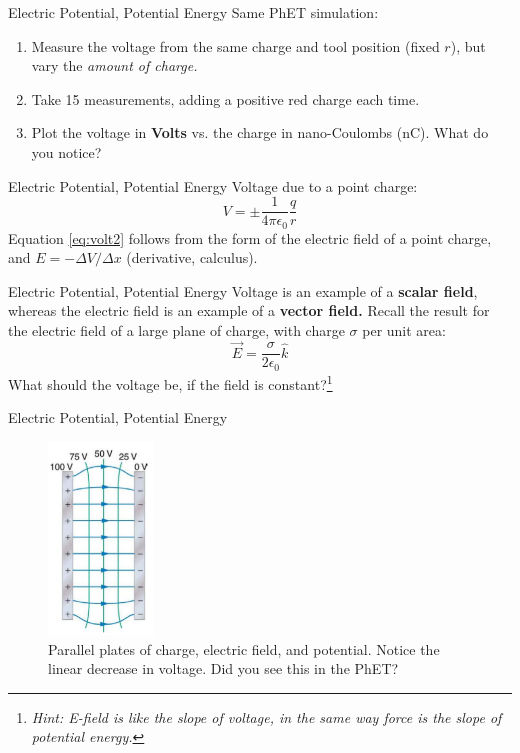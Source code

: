 \documentclass{beamer}
\begin{document}
\begin{frame}{Electric Potential, Potential Energy}
Same PhET simulation:
\begin{enumerate}
\item Measure the voltage from the same charge and tool position (fixed $r$), but vary the \textit{amount of charge.}
\item Take 15 measurements, adding a positive red charge each time.
\item Plot the voltage in \textbf{Volts} vs. the charge in nano-Coulombs (nC).  What do you notice?
\end{enumerate}
\end{frame}

\begin{frame}{Electric Potential, Potential Energy}
Voltage due to a point charge:
\begin{equation}
\boxed{
V = \pm \frac{1}{4\pi \epsilon_0} \frac{q}{r}} \label{eq:volt2}
\end{equation}
Equation \ref{eq:volt2} follows from the form of the electric field of a point charge, and $E = -\Delta V/\Delta x$ (derivative, calculus).
\end{frame}

\begin{frame}{Electric Potential, Potential Energy}
Voltage is an example of a \textbf{scalar field}, whereas the electric field is an example of a \textbf{vector field.}  Recall the result for the electric field of a large plane of charge, with charge $\sigma$ per unit area:
\begin{equation}
\vec{E} = \frac{\sigma}{2\epsilon_0} \hat{k}
\end{equation}
What should the voltage be, if the field is constant?\footnote{\textit{Hint: E-field is like the slope of voltage, in the same way force is the slope of potential energy.}}
\end{frame}

\begin{frame}{Electric Potential, Potential Energy}
\begin{figure}
\centering
\includegraphics[width=0.25\textwidth]{figures/plates.png}
\caption{\label{fig:plates} Parallel plates of charge, electric field, and potential.  Notice the linear decrease in voltage.  Did you see this in the PhET?}
\end{figure}
\end{frame}
\end{document}
